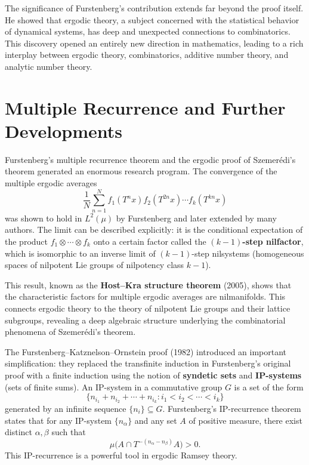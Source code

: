 The significance of Furstenberg's contribution extends far beyond the proof itself. He showed that ergodic theory, a subject concerned with the statistical behavior of dynamical systems, has deep and unexpected connections to combinatorics. This discovery opened an entirely new direction in mathematics, leading to a rich interplay between ergodic theory, combinatorics, additive number theory, and analytic number theory.

\section{Multiple Recurrence and Further Developments}

Furstenberg's multiple recurrence theorem and the ergodic proof of Szemer\'edi's theorem generated an enormous research program. The convergence of the multiple ergodic averages
\[
\frac{1}{N} \sum_{n=1}^{N} f_1(T^n x) f_2(T^{2n}x) \cdots f_k(T^{kn}x)
\]
was shown to hold in \(L^2(\mu)\) by Furstenberg and later extended by many authors. The limit can be described explicitly: it is the conditional expectation of the product \(f_1 \otimes \cdots \otimes f_k\) onto a certain factor called the \textbf{\((k-1)\)-step nilfactor}, which is isomorphic to an inverse limit of \((k-1)\)-step nilsystems (homogeneous spaces of nilpotent Lie groups of nilpotency class \(k-1\)).

This result, known as the \textbf{Host--Kra structure theorem} (2005), shows that the characteristic factors for multiple ergodic averages are nilmanifolds. This connects ergodic theory to the theory of nilpotent Lie groups and their lattice subgroups, revealing a deep algebraic structure underlying the combinatorial phenomena of Szemer\'edi's theorem.

The Furstenberg--Katznelson--Ornstein proof (1982) introduced an important simplification: they replaced the transfinite induction in Furstenberg's original proof with a finite induction using the notion of \textbf{syndetic sets} and \textbf{IP-systems} (sets of finite sums). An IP-system in a commutative group \(G\) is a set of the form
\[
\{n_{i_1} + n_{i_2} + \cdots + n_{i_k} : i_1 < i_2 < \cdots < i_k\}
\]
generated by an infinite sequence \(\{n_i\} \subseteq G\). Furstenberg's IP-recurrence theorem states that for any IP-system \(\{n_\alpha\}\) and any set \(A\) of positive measure, there exist distinct \(\alpha, \beta\) such that
\[
\mu\bigl(A \cap T^{-(n_\alpha - n_\beta)}A\bigr) > 0.
\]
This IP-recurrence is a powerful tool in ergodic Ramsey theory.

